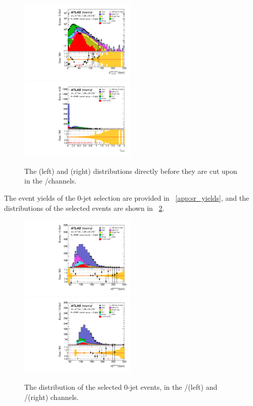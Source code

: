 \begin{figure}
	\includegraphics[width=0.495\textwidth]{tex/selection/eemm_CutTopoMll_0jet_METRel_TrackHWW_Clj_mh125_log}
	\hfill
	\includegraphics[width=0.495\textwidth]{tex/selection/eemm_CutTopoDPhill_0jet_f_recoil_mh125_lin}
	\caption{The \corrtrackmetrel (left) and \frecoil (right) distributions directly 
	before they are cut upon in the \eech/\mmch channels.}
	\label{fig:sel:0j:sf_cuts}
\end{figure}

The event yields of the 0-jet selection are provided in \Appendix~\ref{app:sr_yields}, 
and the \mt distributions of the selected events are shown in \Figure~\ref{fig:sel:0j:mt}.

\begin{figure}
	\includegraphics[width=0.495\textwidth]{tex/selection/emme_CutFRecoil_0jet_MT_TrackHWW_Clj_mh125_lin}
	\hfill
	\includegraphics[width=0.495\textwidth]{tex/selection/eemm_CutFRecoil_0jet_MT_TrackHWW_Clj_mh125_lin}
	\caption{The \mt distribution of the selected 0-jet events, in the \emch/\mech (left) and 
	\eech/\mmch (right) channels.}
	\label{fig:sel:0j:mt}
\end{figure}



